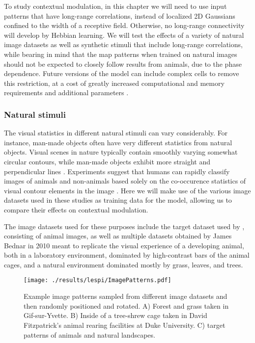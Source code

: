 To study contextual modulation, in this chapter we will need to use
input patterns that have long-range correlations, instead of localized
2D Gaussians confined to the width of a receptive
field.  Otherwise, no long-range connectivity will develop by Hebbian
learning.  We will test the effects of a variety of natural image
datasets as well as synthetic stimuli that include long-range
correlations, while bearing in mind that the map patterns when trained
on natural images should not be expected to closely follow results
from animals, due to the phase dependence.  Future versions of the
model can include complex cells to remove this restriction, at a cost
of greatly increased computational and memory requirements and
additional parameters \citep{Antolik2010}. 

\subsubsection*{Natural stimuli}

The visual statistics in different natural stimuli can vary
considerably.  For instance, man-made objects often have very
different statistics from natural objects. Visual scenes in nature
typically contain smoothly varying somewhat circular contours, while
man-made objects exhibit more straight and perpendicular lines
\citep{Perrinet2015}. Experiments suggest that humans can rapidly
classify images of animals and non-animals based solely on the
co-occurence statistics of visual contour elements in the image
\citep{Serre2007, Perrinet2015}. Here we will make use of the various
image datasets used in these studies as training data for the model,
allowing us to compare their effects on contextual modulation.

The image datasets used for these purposes include the target dataset
used by \cite{Serre2007}, consisting of animal images, as well as
multiple datasets obtained by James Bednar in 2010 meant to replicate the
visual experience of a developing animal, both in a laboratory environment,
dominated by high-contrast bars of the animal cages, and a
natural environment dominated mostly by grass, leaves, and trees.

\begin{figure}
	\centering
	\texttt{[image: ./results/lespi/ImagePatterns.pdf]}
	\caption[Example image patterns used to train the model] {Example
      image patterns sampled from different image datasets and then
      randomly positioned and rotated. A) Forest and grass taken in
      Gif-sur-Yvette. B) Inside of a tree-shrew cage taken in David
      Fitzpatrick's animal rearing facilities at Duke University.
      C) \cite{Serre2007} target patterns of animals and natural landscapes.}
    \label{image_patterns}
\end{figure}

